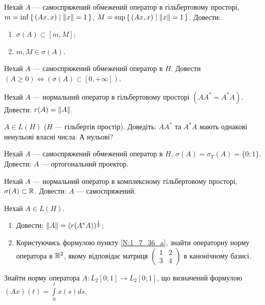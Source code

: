 
\begin{exercise}
    Нехай $A$ --- самоспряжений обмежений оператор в гільбертовому просторі,
    $m = \inf\set{\left(Ax, x\right) \mid \left\lVert x\right\rVert=1}$,
    $M = \sup\set{\left(Ax, x\right) \mid \left\lVert x\right\rVert=1}$.
    Довести:
    \begin{enumerate}
        \item $\sigma(A) \subset [m,M]$;
        \item $m,M \in \sigma(A)$.
    \end{enumerate}
\end{exercise}

\begin{exercise}
    Нехай $A$ --- самоспряжений обмежений оператор в $H$. Довести $(A \geq 0)
    \Leftrightarrow (\sigma(A) \subset [0,+\infty])$.
\end{exercise}

\begin{exercise}
    Нехай $A$ --- нормальний оператор в гільбертовому просторі $(AA^* = A^* A)$.
    Довести: $r(A) = \left\lVert A\right\rVert$.
\end{exercise}

\begin{exercise}
    $A \in L(H)$ ($H$ --- гільбертів простір). Доведіть: $AA^*$ та $A^* A$ мають
    однакові ненульові власні числа. А нульові?
\end{exercise}

\begin{exercise}
    Нехай $A$ --- самоспряжений обмежений оператор в $H$, $\sigma(A) = \sigma_T(A)
    = \{0;1\}$. Довести: $A$ --- ортогональний проектор.
\end{exercise}

\begin{exercise}
    Нехай $A$ --- нормальний оператор в комплексному гільбертовому просторі,
    $\sigma(A) \subset \mathbb{R}$. Довести: $A$ --- самоспряжений.
\end{exercise}

\begin{exercise}
    Нехай $A \in L(H)$.
    \begin{enumerate}
        \item\label{N:1_7_36_a} Довести: $\left\lVert A\right\rVert = (r(A^*A))^{\frac{1}{2}}$;
        \item Користуючись формулою пункту \ref{N:1_7_36_a},  знайти операторну
        норму оператора в $\mathbb{R}^2$, якому відповідає матриця $\begin{pmatrix}
        1 & 2 \\ 3 & 4 \end{pmatrix}$ в канонічному базисі.
    \end{enumerate}
\end{exercise}

\begin{exercise}
    Знайти норму оператора $A: L_2[0;1] \to L_2[0;1]$, що визначений формулою
    $(Ax)(t) = \int\limits^t_0 x(s)ds$.
\end{exercise}